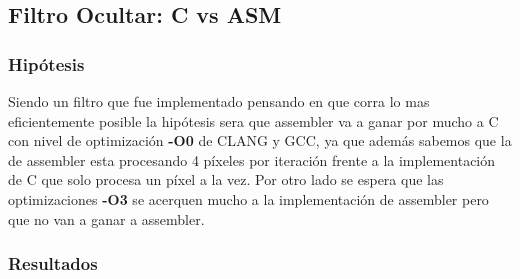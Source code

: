 \documentclass[a4paper]{article}
\begin{document}
\newpage
\subsection{Filtro Ocultar: C vs ASM}
\subsubsection{Hipótesis}
Siendo un filtro que fue implementado pensando en que corra lo mas eficientemente posible la hipótesis sera que assembler va a ganar por mucho a C con nivel de optimización \textbf{-O0} de CLANG y GCC, ya que además sabemos que la de assembler esta procesando 4 píxeles por iteración frente a la implementación de C que solo procesa un píxel a la vez. Por otro lado se espera que las optimizaciones \textbf{-O3} se acerquen mucho a la implementación de assembler pero que no van a ganar a assembler.

\subsubsection{Resultados}
\end{document}
